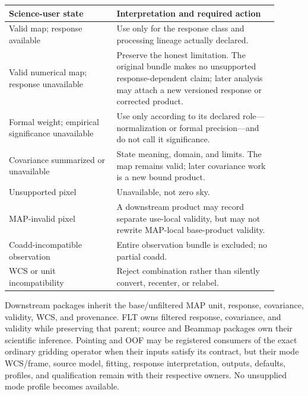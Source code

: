 \documentclass[10pt]{article}
\begin{document}
\begin{longtable}{L{0.36\linewidth}L{0.54\linewidth}}
\toprule Science-user state & Interpretation and required action \\
\midrule
Valid map; response available & Use only for the response class and processing lineage actually declared.\\
Valid numerical map; response unavailable & Preserve the honest limitation. The original bundle makes no unsupported response-dependent claim; later analysis may attach a new versioned response or corrected product.\\
Formal weight; empirical significance unavailable & Use only according to its declared role---normalization or formal precision---and do not call it significance.\\
Covariance summarized or unavailable & State meaning, domain, and limits. The map remains valid; later covariance work is a new bound product.\\
Unsupported pixel & Unavailable, not zero sky.\\
MAP-invalid pixel & A downstream product may record separate use-local validity, but may not rewrite MAP-local base-product validity.\\
Coadd-incompatible observation & Entire observation bundle is excluded; no partial coadd.\\
WCS or unit incompatibility & Reject combination rather than silently convert, recenter, or relabel.\\
\bottomrule
\end{longtable}

Downstream packages inherit the base/unfiltered MAP unit, response, covariance,
validity, WCS, and provenance. \SCIMapNOIOwnershipStatement{} FLT
owns filtered response, covariance, and validity while preserving that parent;
source and Beammap packages own their scientific inference. Pointing and OOF
may be registered consumers of the exact ordinary gridding operator when their
inputs satisfy its contract, but their mode WCS/frame, source model, fitting,
response interpretation, outputs, defaults, profiles, and qualification remain
with their respective owners. No unsupplied mode profile becomes available.
\end{document}
